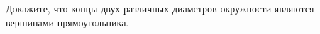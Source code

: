 \begin{ex}
	\begin{condition}
		Докажите, что концы двух различных диаметров окружности являются вершинами прямоугольника.
	\end{condition}
\end{ex}